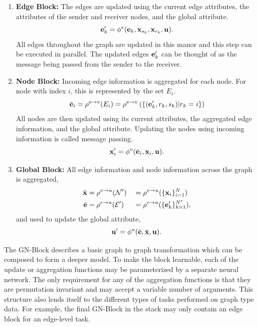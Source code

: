\begin{enumerate}
    \item \textbf{Edge Block:} The edges are updated using the current edge attributes, the attributes of the sender and receiver nodes, and the global attribute.
    \begin{equation}
        \mathbf{e}_k' = \phi^e(\mathbf{e}_k, \mathbf{x}_{s_k}, \mathbf{x}_{r_k}, \mathbf{u}).
    \end{equation}
    All edges throughout the graph are updated in this manor and this step can be executed in parallel.
    The updated edges $\mathbf{e}_k'$ can be thought of as the message being passed from the sender to the receiver.
    \item \textbf{Node Block:} Incoming edge information is aggregated for each node.
    For node with index $i$, this is represented by the set $E_i$.
    \begin{equation}
        \bar{\mathbf{e}}_i = \rho^{e \to v}(E_i) = \rho^{e \to v}\left(\{(\mathbf{e}_k', r_k, s_k) | r_k = i\}\right)
    \end{equation}
    All nodes are then updated using its current attributes, the aggregated edge information, and the global attribute.
    Updating the nodes using incoming information is called message passing.
    \begin{equation}
        \mathbf{x}_i' = \phi^v(\bar{\mathbf{e}}_i, \mathbf{x}_i, \mathbf{u}).
    \end{equation}
    \item \textbf{Global Block:} All edge information and node information across the graph is aggregated,
    \begin{alignat}{2}
        \bar{\mathbf{x}} &= \rho^{v \to u}(\mathcal{N}') &&= \rho^{v \to u}(\{\mathbf{x}_i\}_{i=1}^{N}) \\
        \bar{\mathbf{e}} &= \rho^{e \to u}(\mathcal{E}') &&= \rho^{e \to u}(\{\mathbf{e}_k'\}_{k=1}^{N^e}),
    \end{alignat}
    and used to update the global attribute,
    \begin{equation}
        \mathbf{u}' = \phi^u( \bar{\mathbf{e}}, \bar{\mathbf{x}}, \mathbf{u}).
    \end{equation}
\end{enumerate}

The GN-Block describes a basic graph to graph transformation which can be composed to form a deeper model.
To make the block learnable, each of the update or aggregation functions may be parameterized by a separate neural network.
The only requirement for any of the aggregation functions is that they are permutation invariant and may accept a variable number of arguments.
This structure also lends itself to the different types of tasks performed on graph type data.
For example, the final GN-Block in the stack may only contain an edge block for an edge-level task.

